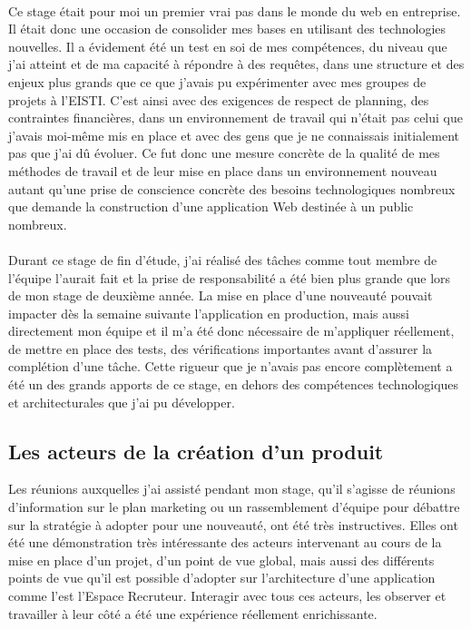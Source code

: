 \paragraph{}
Ce stage était pour moi un premier vrai pas dans le monde du web en entreprise.
Il était donc une occasion de consolider mes bases en utilisant des technologies nouvelles.
Il a évidement été un test en soi de mes compétences, du niveau que j'ai atteint et de ma capacité à répondre à des requêtes, dans une structure et des enjeux plus grands que ce que j'avais pu expérimenter avec mes groupes de projets à l'EISTI.
C'est ainsi avec des exigences de respect de planning, des contraintes financières, dans un environnement de travail qui n'était pas celui que j'avais moi-même mis en place et avec des gens que je ne connaissais initialement pas que j'ai dû évoluer.
Ce fut donc une mesure concrète de la qualité de mes méthodes de travail et de leur mise en place dans un environnement nouveau autant qu'une prise de conscience concrète des besoins technologiques nombreux que demande la construction d'une application Web destinée à un public nombreux.
\paragraph{}
Durant ce stage de fin d'étude, j'ai réalisé des tâches comme tout membre de l'équipe l'aurait fait et la prise de responsabilité a été bien plus grande que lors de mon stage de deuxième année.
La mise en place d'une nouveauté pouvait impacter dès la semaine suivante l'application en production, mais aussi directement mon équipe et il m'a été donc nécessaire de m'appliquer réellement, de mettre en place des tests, des vérifications importantes avant d'assurer la complétion d'une tâche.
Cette rigueur que je n'avais pas encore complètement a été un des grands apports de ce stage, en dehors des compétences technologiques et architecturales que j'ai pu développer.

\subsection{Les acteurs de la création d'un produit}
\label{sub:Les acteurs de la création d'un produit}
Les réunions auxquelles j'ai assisté pendant mon stage, qu'il s'agisse de réunions d'information sur le plan marketing ou un rassemblement d'équipe pour débattre sur la stratégie à adopter pour une nouveauté, ont été très instructives.
Elles ont été une démonstration très intéressante des acteurs intervenant au cours de la mise en place d'un projet, d'un point de vue global, mais aussi des différents points de vue qu'il est possible d'adopter sur l'architecture d'une application comme l'est l'Espace Recruteur.
Interagir avec tous ces acteurs, les observer et travailler à leur côté a été une expérience réellement enrichissante.

